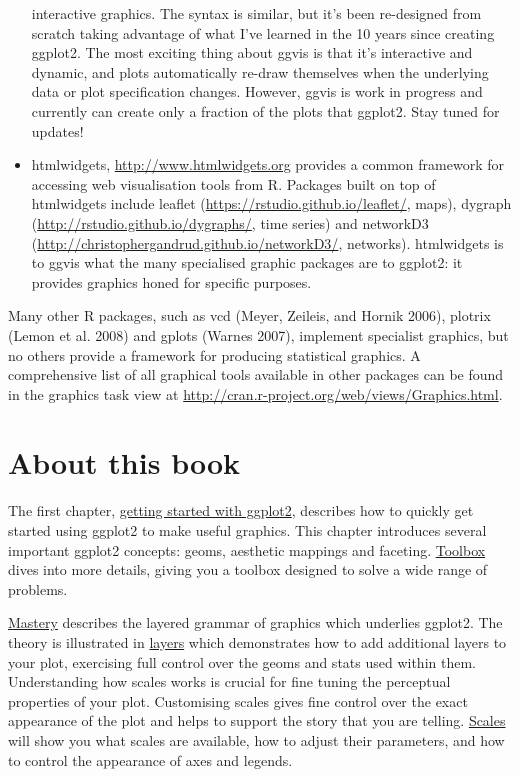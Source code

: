 \begin{itemize}
  interactive graphics. The syntax is similar, but it's been re-designed
  from scratch taking advantage of what I've learned in the 10 years
  since creating ggplot2. The most exciting thing about ggvis is that
  it's interactive and dynamic, and plots automatically re-draw
  themselves when the underlying data or plot specification changes.
  However, ggvis is work in progress and currently can create only a
  fraction of the plots that ggplot2. Stay tuned for updates!
\item
  htmlwidgets, \url{http://www.htmlwidgets.org} provides a common
  framework for accessing web visualisation tools from R. Packages built
  on top of htmlwidgets include leaflet
  (\url{https://rstudio.github.io/leaflet/}, maps), dygraph
  (\url{http://rstudio.github.io/dygraphs/}, time series) and networkD3
  (\url{http://christophergandrud.github.io/networkD3/}, networks).
  htmlwidgets is to ggvis what the many specialised graphic packages are
  to ggplot2: it provides graphics honed for specific purposes.
\end{itemize}

Many other R packages, such as vcd (Meyer, Zeileis, and Hornik 2006),
plotrix (Lemon et al. 2008) and gplots (Warnes 2007), implement
specialist graphics, but no others provide a framework for producing
statistical graphics. A comprehensive list of all graphical tools
available in other packages can be found in the graphics task view at
\url{http://cran.r-project.org/web/views/Graphics.html}.

\section{About this book}

The first chapter, \hyperref[cha:getting-started]{getting started with
ggplot2}, describes how to quickly get started using ggplot2 to make
useful graphics. This chapter introduces several important ggplot2
concepts: geoms, aesthetic mappings and faceting.
\hyperref[cha:toolbox]{Toolbox} dives into more details, giving you a
toolbox designed to solve a wide range of problems.

\hyperref[cha:mastery]{Mastery} describes the layered grammar of
graphics which underlies ggplot2. The theory is illustrated in
\hyperref[cha:layers]{layers} which demonstrates how to add additional
layers to your plot, exercising full control over the geoms and stats
used within them. Understanding how scales works is crucial for fine
tuning the perceptual properties of your plot. Customising scales gives
fine control over the exact appearance of the plot and helps to support
the story that you are telling. \hyperref[cha:scales]{Scales} will show
you what scales are available, how to adjust their parameters, and how
to control the appearance of axes and legends.

